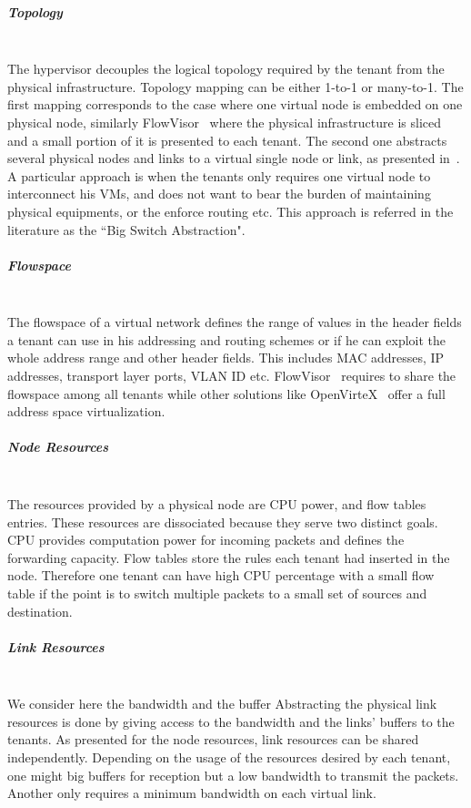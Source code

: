 \subparagraph{\textbf{Topology}}\textbf{}\\
The hypervisor decouples the logical topology required by the tenant from the physical infrastructure.
Topology mapping can be either 1-to-1 or many-to-1. 
The first mapping corresponds to the case where one virtual node is embedded on one physical node, similarly FlowVisor~\cite{FlowVisor-Sherwood2009} where the physical infrastructure is sliced and a small portion of it is presented to each tenant.
The second one abstracts several physical nodes and links to a virtual single node or link, as  presented in~\cite{OpenVirteX-Al-Shabibi2014}.
A particular approach is when the tenants only requires one virtual node to interconnect his VMs, and does not want to bear the burden of maintaining physical equipments, or the enforce routing etc. This approach is referred in the literature as the ``Big Switch Abstraction".


\subparagraph{\textbf{Flowspace}}\textbf{}\\
The flowspace of a virtual network defines the range of values in the header fields a tenant can use in his addressing and routing schemes or if he can exploit the whole address range and other header fields.
This includes MAC addresses, IP addresses, transport layer ports, VLAN ID etc.
FlowVisor~\cite{FlowVisor-Sherwood2009} requires to share the flowspace among all tenants while other solutions like OpenVirteX~\cite{OpenVirteX-Al-Shabibi2014} offer a full address space virtualization.

\subparagraph{\textbf{Node Resources}}\textbf{}\\
The resources provided by a physical node are CPU power, and flow tables entries.
These resources are dissociated because they serve two distinct goals.
CPU provides computation power for incoming packets and defines the forwarding capacity.
Flow tables store the rules each tenant had inserted in the node.
Therefore one tenant can have high CPU percentage with a small flow table if the point is to switch multiple packets to a small set of sources and destination.

\subparagraph{\textbf{Link Resources}}\textbf{}\\
We consider here the bandwidth and the buffer
Abstracting the physical link resources is done by giving access to the bandwidth and the links' buffers to the tenants.
As presented for the node resources, link resources can be shared independently.
Depending on the usage of the resources desired by each tenant, one might big buffers for reception but a low bandwidth to transmit the packets.
Another only requires a minimum bandwidth on each virtual link.

